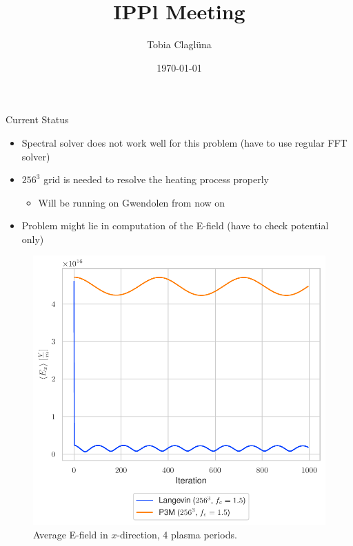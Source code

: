 
\title[\today]{IPPl Meeting}

\author{Tobia Claglüna}
\date{\today}
\def \myEmail {tobia.clagluena@psi.ch}





\begin{frame}[t]{Current Status}
    \begin{large}
    \begin{itemize}
        \item Spectral solver does not work well for this problem (have to use regular FFT solver)
        \item $256^3$ grid is needed to resolve the heating process properly
        \begin{itemize}
            \item Will be running on Gwendolen from now on
        \end{itemize}
        \item Problem might lie in computation of the E-field (have to check potential only)
    \end{itemize}
    \end{large}

    \begin{figure}[!htb]
        \centering
        \captionsetup{justification=centering}
      \includegraphics[width=0.45\linewidth]{figures/avgEF.pdf}
      \caption{Average E-field in $x$-direction, 4 plasma periods.}
      \label{fig:awesome_image6}
    \end{figure}

\end{frame}


